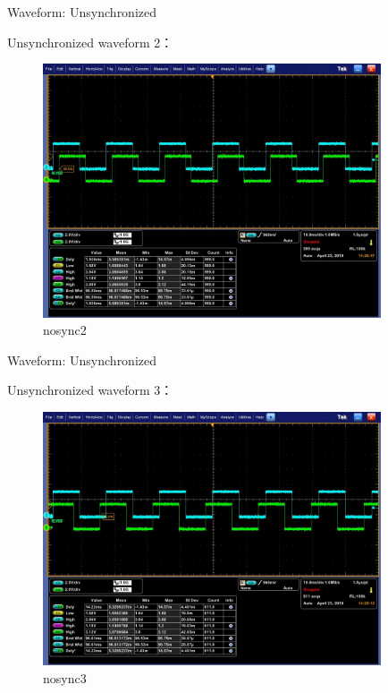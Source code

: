 \begin{frame}[fragile]{Waveform: Unsynchronized}

Unsynchronized waveform 2：

  \begin{figure}[htbp]
  \begin{center}
  \includegraphics[width=10cm]{img/nosync2}
  \caption{nosync2}
  \label{report}
  \end{center}
  \vspace{-0.5em}
  \end{figure}


\end{frame}


\begin{frame}[fragile]{Waveform: Unsynchronized}

Unsynchronized waveform 3：

  \begin{figure}[htbp]
  \begin{center}
  \includegraphics[width=10cm]{img/nosync3}
  \caption{nosync3}
  \label{report}
  \end{center}
  \vspace{-0.5em}
  \end{figure}


\end{frame}


